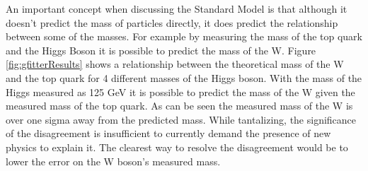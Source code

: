 An important concept when discussing the Standard Model is that although it doesn't predict the mass of particles directly, it does predict the relationship between some of the masses. For example by measuring the mass of the top quark and the Higgs Boson it is possible to predict the mass of the W. Figure \ref{fig:gfitterResults} shows a relationship between the theoretical mass of the W and the top quark for 4 different masses of the Higgs boson. With the mass of the Higgs measured as 125 GeV it is possible to predict the mass of the W given the measured mass of the top quark. As can be seen the measured mass of the W is over one sigma away from the predicted mass. While tantalizing, the significance of the disagreement is insufficient to currently demand the presence of new physics to explain it. The clearest way to resolve the disagreement would be to lower the error on the W boson's measured mass. \par
